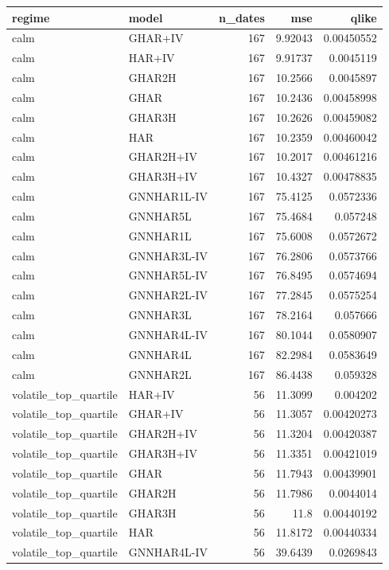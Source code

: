 \begin{tabular}{llrrr}
\toprule
regime & model & n_dates & mse & qlike \\
\midrule
calm & GHAR+IV & 167 & 9.92043 & 0.00450552 \\
calm & HAR+IV & 167 & 9.91737 & 0.0045119 \\
calm & GHAR2H & 167 & 10.2566 & 0.0045897 \\
calm & GHAR & 167 & 10.2436 & 0.00458998 \\
calm & GHAR3H & 167 & 10.2626 & 0.00459082 \\
calm & HAR & 167 & 10.2359 & 0.00460042 \\
calm & GHAR2H+IV & 167 & 10.2017 & 0.00461216 \\
calm & GHAR3H+IV & 167 & 10.4327 & 0.00478835 \\
calm & GNNHAR1L-IV & 167 & 75.4125 & 0.0572336 \\
calm & GNNHAR5L & 167 & 75.4684 & 0.057248 \\
calm & GNNHAR1L & 167 & 75.6008 & 0.0572672 \\
calm & GNNHAR3L-IV & 167 & 76.2806 & 0.0573766 \\
calm & GNNHAR5L-IV & 167 & 76.8495 & 0.0574694 \\
calm & GNNHAR2L-IV & 167 & 77.2845 & 0.0575254 \\
calm & GNNHAR3L & 167 & 78.2164 & 0.057666 \\
calm & GNNHAR4L-IV & 167 & 80.1044 & 0.0580907 \\
calm & GNNHAR4L & 167 & 82.2984 & 0.0583649 \\
calm & GNNHAR2L & 167 & 86.4438 & 0.059328 \\
volatile_top_quartile & HAR+IV & 56 & 11.3099 & 0.004202 \\
volatile_top_quartile & GHAR+IV & 56 & 11.3057 & 0.00420273 \\
volatile_top_quartile & GHAR2H+IV & 56 & 11.3204 & 0.00420387 \\
volatile_top_quartile & GHAR3H+IV & 56 & 11.3351 & 0.00421019 \\
volatile_top_quartile & GHAR & 56 & 11.7943 & 0.00439901 \\
volatile_top_quartile & GHAR2H & 56 & 11.7986 & 0.0044014 \\
volatile_top_quartile & GHAR3H & 56 & 11.8 & 0.00440192 \\
volatile_top_quartile & HAR & 56 & 11.8172 & 0.00440334 \\
volatile_top_quartile & GNNHAR4L-IV & 56 & 39.6439 & 0.0269843 \\

\end{tabular}
